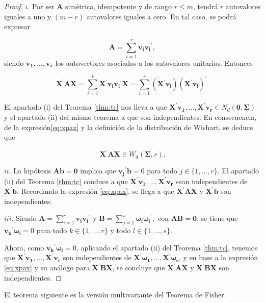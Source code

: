 \documentclass[
  a4paper,
  oneside]{scrbook}
\theoremstyle{definition}
\theoremstyle{definition}
\theoremstyle{definition}
\theoremstyle{definition}
\theoremstyle{remark}
\begin{document}
\begin{proof}
\(i.\) Por ser \(\bm{A}\) simétrica, idempotente y de rango
\(r\leq m\), tendrá \(r\) autovalores iguales a uno y \((m-r)\) autovalores
iguales a cero. En tal caso, se podrá expresar

\[\bm{A}=\sum_{i=1}^r \bm{v_i}\bm{v_i}^\prime{},\] siendo
\(\bm{v_1},\ldots,\bm{v_r}\) los autovectores asociados a los autovalores
unitarios. Entonces

\begin{equation}
\bm{X}^\prime{}\bm{A}\bm{X}=\sum_{i=1}^r \bm{X}^\prime{}\bm{v_i}\bm{v_i}^\prime{}\bm{X}=\sum_{i=1}^r \left(\bm{X}^\prime{}\bm{v_i}\right)\left(\bm{X}^\prime{}\bm{v_i}\right)^{\prime}.
\label{eq:xpax}
\end{equation}

El apartado (i) del Teorema \ref{thm:tc} nos lleva a que
\(\bm{X}^\prime{}\bm{v_1},\ldots,\bm{X}^\prime{}\bm{v_r}\in N_d(\bm{0},\bm\Sigma)\)
y el apartado (ii) del mismo teorema a que son independientes. En
consecuencia, de la expresión\eqref{eq:xpax} y la
definición de la distribución de Wishart, se deduce que

\[\bm{X}^\prime{}\bm{A}\bm{X}\in W_d(\bm\Sigma,r).\]

\(ii.\) La hipótesis \(\bm{A}\bm{b}=\bm{0}\) implica que
\(\bm{v_j}^\prime{}\bm{b}=0\) para todo \(j\in\{1,\ldots,r\}\). El apartado
(ii) del Teorema \ref{thm:tc}
conduce a que \(\bm{X}^\prime\bm{v_1},\ldots,\bm{X}^\prime\bm{v_r}\) sean
independientes de \(\bm{X}^\prime\bm{b}\). Recordando la expresión
\eqref{eq:xpax}, se
llega a que \(\bm{X}^\prime{}\bm{A}\bm{X}\) y \(\bm{X}^\prime{}\bm{b}\) son
independientes.

\(iii.\) Siendo \(\bm{A}=\sum_{i=1}^r \bm{v_i}\bm{v_i}^\prime{}\) y
\(\bm{B}=\sum_{j=1}^s \bm{\omega_i}\bm{\omega_i}^\prime{},\) con
\(\bm{A}\bm{B}=\bm{0}\), se tiene que \(\bm{v_k}^\prime{}\bm{\omega_l}=0\)
para todo \(k\in\{1,\ldots,r\}\) y todo \(l\in\{1,\ldots,s\}\).

Ahora, como \(\bm{v_k}^\prime{}\bm{\omega_l}=0\), aplicando el apartado
(ii) del Teorema \ref{thm:tc},
tenemos que \(\bm{X}^\prime{}\bm{v_1},\ldots,\bm{X}^\prime{}\bm{v_r}\) son
independientes de
\(\bm{X}^\prime{}\bm{\omega_1},\ldots,\bm{X}^\prime{}\bm{\omega_s}\), y en
base a la expresión \eqref{eq:xpax} y su análogo para \(\bm{X}^\prime{}\bm{B}\bm{X}\),
se concluye que \(\bm{X}^\prime{}\bm{A}\bm{X}\) y
\(\bm{X}^\prime{}\bm{B}\bm{X}\) son independientes.
\end{proof}

El teorema siguiente es la versión multivariante del Teorema de Fisher.
\end{document}
